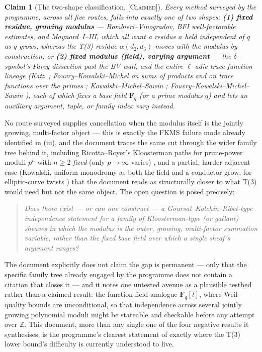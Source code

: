 \documentclass[11pt]{article}
\theoremstyle{plain}
\newtheorem{claimstmt}[theorem]{Claim}
\theoremstyle{definition}
\theoremstyle{remark}
\newcommand{\CLAIMED}{\textcolor{claimed}{\textsc{[Claimed]}}}
\renewcommand{\_}{\textunderscore\allowbreak}
\newcommand{\Z}{\mathbb{Z}}
\begin{document}
\begin{claimstmt}[The two-shape classification, \CLAIMED{}]
Every method surveyed by the programme, across all five routes, falls into exactly one of two
shapes: \textbf{(1) fixed residue, growing modulus} — Bombieri--Vinogradov, BFI well-factorable
estimates, and Maynard~I--III, which all want a residue $a$ held independent of $q$ as $q$
grows, whereas the T(3) residue $\alpha(d_2,d_3)$ moves with the modulus by construction; or
\textbf{(2) fixed modulus (field), varying argument} — the $\delta$-symbol's Farey dissection
past the BV wall, and the entire $\ell$-adic trace-function lineage (Katz~\cite{Katz1988};
Fouvry--Kowalski--Michel on sums of products \cite{FouvryKowalskiMichel2015} and on trace
functions over the primes \cite{FouvryKowalskiMichel2014}; Kowalski--Michel--Sawin
\cite{KowalskiMichelSawin2017}; Fouvry--Kowalski--Michel--Sawin \cite{FKMS2026}), each of which
fixes a base field $\mathbf F_q$ (or a prime modulus $q$) and lets an auxiliary argument, tuple,
or family index vary instead.
\end{claimstmt}
No route surveyed supplies cancellation when the modulus itself is the jointly growing,
multi-factor object — this is exactly the FKMS failure mode already identified in
(iii), and the document traces the same cut through the wider family
tree behind it, including Ricotta--Royer's Kloosterman paths for prime-power moduli $p^n$ with
$n\ge2$ \emph{fixed} (only $p\to\infty$ varies) \cite{RicottaRoyer2016}, and a partial, harder
adjacent case (Kowalski, uniform monodromy as both the field and a conductor grow, for
elliptic-curve twists \cite{Kowalski2006}) that the document reads as structurally closer to
what T(3) would need but not the same object. The open question is posed precisely:
\begin{quote}\itshape
Does there exist — or can one construct — a Goursat--Kolchin--Ribet-type independence statement
for a family of Kloosterman-type (or gallant) sheaves in which the modulus is the outer,
growing, multi-factor summation variable, rather than the fixed base field over which a single
sheaf's argument ranges?
\end{quote}
The document explicitly does not claim the gap is permanent — only that the specific family tree
already engaged by the programme does not contain a citation that closes it — and it notes one
untested avenue as a plausible testbed rather than a claimed result: the function-field analogue
$\mathbf F_q[t]$, where Weil-quality bounds are unconditional, so that independence across
several jointly growing polynomial moduli might be stateable and checkable before any attempt
over $\Z$. This document, more than any single one of the four negative results it synthesises,
is the programme's clearest statement of exactly where the T(3) lower bound's difficulty is
currently understood to live.
\end{document}
